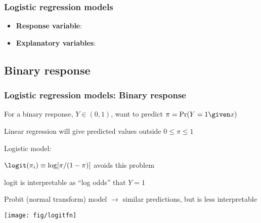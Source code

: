\renewcommand{\FileName}{logistic}
\begin{frame}
  \frametitle{Logistic regression models}
  \begin{itemize}
	\item{\large\bfseries Response variable}:
	\item{\large\bfseries Explanatory variables}:
  \end{itemize}
\end{frame}

\subsection{Binary response}
\begin{frame}
  \frametitle{Logistic regression models: Binary response}
  \begin{itemize*}
	\item For a binary response, $Y \in (0,1)$, want to predict $\pi = \Pr(Y=1 \given x)$
	\item Linear regression will give predicted values outside $0 \le \pi \le 1$
	\item Logistic model:
	\begin{itemize*}
	  \item $\logit ( \pi_{i}) \equiv \log [ \pi / (1 - \pi)]$ avoids this problem
	  \item logit is interpretable as ``log odds'' that $Y=1$
	\end{itemize*}
	
	\item Probit (normal transform) model $\rightarrow$ similar predictions, but is less
	interpretable
 \begin{center}
  \texttt{[image: fig/logitfn]}
 \end{center}
  \end{itemize*}

\end{frame}

